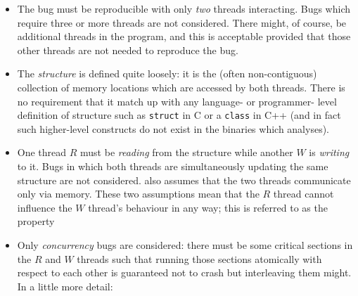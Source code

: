 \begin{itemize}
\item The bug must be reproducible with only \emph{two} threads
  interacting.  Bugs which require three or more threads are not
  considered.  There might, of course, be additional threads in the
  program, and this is acceptable provided that those other threads
  are not needed to reproduce the bug.
\item The \emph{structure} is defined quite loosely: it is the (often
  non-contiguous) collection of memory locations which are accessed by
  both threads.  There is no requirement that it match up with any
  language- or programmer- level definition of structure such as
  \verb|struct| in C or a \verb|class| in C++ (and in fact such
  higher-level constructs do not exist in the binaries which
  {\technique} analyses).
\item One thread $R$ must be \emph{reading} from the structure while
  another $W$ is \emph{writing} to it.  Bugs in which both threads are
  simultaneously updating the same structure are not considered.  {\Technique} also assumes that the two threads
  communicate only via memory.  These two assumptions mean that the
  $R$ thread cannot influence the $W$ thread's behaviour in any way;
  this is referred to as the  property
\item Only \emph{concurrency} bugs are considered: there must be some
  critical sections in the $R$ and $W$ threads such that running those
  sections atomically with respect to each other is guaranteed not to
  crash but interleaving them might.  In a little more detail:


\end{itemize}
